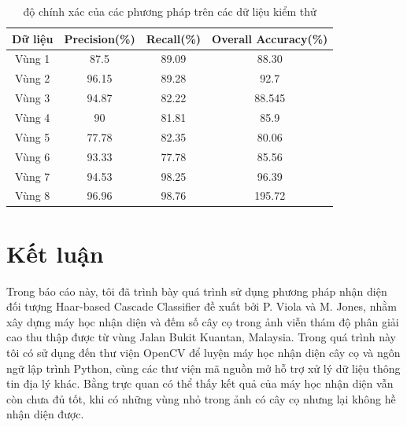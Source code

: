 \documentclass[14pt, oneside, a4paper, openany]{scrartcl}
\begin{document}
\begin{table}[!h]
	\caption[độ chính xác của các phương pháp trên các dữ liệu kiểm thử]{độ chính xác của các phương pháp trên các dữ liệu kiểm thử}
	\centering
	\begin{tabular}{ |c|c|c|c| } 
		\hline
		Dữ liệu & Precision(\%) & Recall(\%) & Overall Accuracy(\%)\\ 
		\hline
		Vùng 1 & 87.5 & 89.09 & 88.30\\
		Vùng 2 & 96.15 & 89.28 & 92.7\\ 
		Vùng 3 & 94.87 & 82.22 & 88.545\\ 
		Vùng 4 & 90 & 81.81 & 85.9\\ 
		Vùng 5 & 77.78 & 82.35 & 80.06\\ 
		Vùng 6 & 93.33 & 77.78 & 85.56\\ 
		Vùng 7 & 94.53 & 98.25 & 96.39\\ 
		Vùng 8 & 96.96 & 98.76 & 195.72\\ 
		\hline
	\end{tabular}
\end{table}
\newpage
\section{Kết luận}
Trong báo cáo này, tôi đã trình bày quá trình sử dụng phương pháp nhận diện đối tượng Haar-based Cascade Classifier đề xuất bởi P. Viola và  M. Jones, nhằm xây dựng máy học nhận diện và đếm số cây cọ trong ảnh viễn thám độ phân giải cao thu thập được từ vùng Jalan Bukit Kuantan, Malaysia. Trong quá trình này tôi có sử dụng đến thư viện OpenCV để luyện máy học nhận diện cây cọ và ngôn ngữ lập trình Python, cùng các thư viện mã nguồn mở hỗ trợ xử lý dữ liệu thông tin địa lý khác. Bằng trực quan có thể thấy kết quả của máy học nhận diện vẫn còn chưa đủ tốt, khi có những vùng nhỏ trong ảnh có cây cọ nhưng lại không hề nhận diện được.
\end{document}
